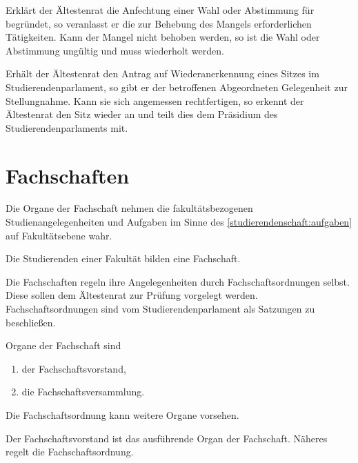 Erklärt der Ältestenrat die Anfechtung einer Wahl oder Abstimmung für begründet, so veranlasst er die zur Behebung des Mangels erforderlichen Tätigkeiten. Kann der Mangel nicht behoben werden, so ist die Wahl oder Abstimmung ungültig und muss wiederholt werden. 

Erhält der Ältestenrat den Antrag auf Wiederanerkennung eines Sitzes im Studierendenparlament, so gibt er der betroffenen Abgeordneten Gelegenheit zur Stellungnahme. Kann sie sich angemessen rechtfertigen, so erkennt der Ältestenrat den Sitz wieder an und teilt dies dem Präsidium des Studierendenparlaments mit.


%
%

\parnumberfalse \section{Fachschaften} \parnumbertrue

 \label{fachschaften:aufgaben}

\parnumberfalse Die Organe der Fachschaft nehmen die fakultätsbezogenen Studienangelegenheiten und Aufgaben im Sinne des \ref{studierendenschaft:aufgaben} auf Fakultätsebene wahr. \parnumbertrue

\label{fachschaften:gliederung}

Die Studierenden einer Fakultät bilden eine Fachschaft. 

Die Fachschaften regeln ihre Angelegenheiten durch Fachschaftsordnungen selbst. Diese sollen dem Ältestenrat zur Prüfung vorgelegt werden. Fachschaftsordnungen sind vom Studierendenparlament als Satzungen zu beschließen.



Organe der Fachschaft sind
  \begin{enumerate}
  \item der Fachschaftsvorstand,
  \item die Fachschaftsversammlung.
  \end{enumerate}

Die Fachschaftsordnung kann weitere Organe vorsehen.


\label{fs:vorstand}

Der Fachschaftsvorstand ist das ausführende Organ der Fachschaft. Näheres regelt die Fachschaftsordnung.

